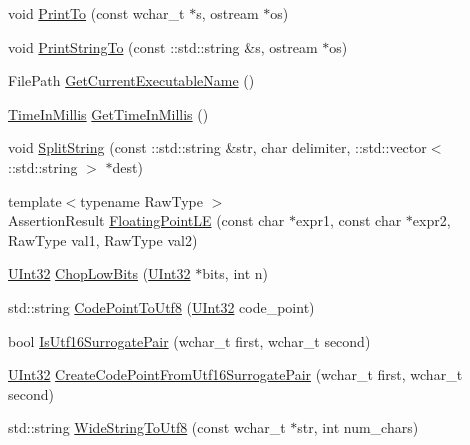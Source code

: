 \begin{DoxyCompactItemize}
void \mbox{\hyperlink{namespacetesting_1_1internal_afc20fb56b2547a8f91f9ff99650f2024}{Print\+To}} (const wchar\+\_\+t $\ast$s, ostream $\ast$os)
\item 
void \mbox{\hyperlink{namespacetesting_1_1internal_ad609167d8d6792b0fb186539e0e159bd}{Print\+String\+To}} (const \+::std\+::string \&s, ostream $\ast$os)
\item 
File\+Path \mbox{\hyperlink{namespacetesting_1_1internal_a7a2bbf069f75bc99873976ad6fc356ad}{Get\+Current\+Executable\+Name}} ()
\item 
\mbox{\hyperlink{namespacetesting_1_1internal_a5eed833eddf9ea8ca45546c125f4ef0c}{Time\+In\+Millis}} \mbox{\hyperlink{namespacetesting_1_1internal_ae66b46943a429e6efb1db456d4cae90c}{Get\+Time\+In\+Millis}} ()
\item 
void \mbox{\hyperlink{namespacetesting_1_1internal_a8eb8eddf760375a490e007b20777ec56}{Split\+String}} (const \+::std\+::string \&str, char delimiter, \+::std\+::vector$<$ \+::std\+::string $>$ $\ast$dest)
\item 
{\footnotesize template$<$typename Raw\+Type $>$ }\\Assertion\+Result \mbox{\hyperlink{namespacetesting_1_1internal_a17b52b6b1f81f6dcad5cc4d12e5173a6}{Floating\+Point\+LE}} (const char $\ast$expr1, const char $\ast$expr2, Raw\+Type val1, Raw\+Type val2)
\item 
\mbox{\hyperlink{namespacetesting_1_1internal_a436defbb8e92c8e94e33ebcc86f278ba}{U\+Int32}} \mbox{\hyperlink{namespacetesting_1_1internal_a2c54b453387aa8a18f2f3e09f10b5a7d}{Chop\+Low\+Bits}} (\mbox{\hyperlink{namespacetesting_1_1internal_a436defbb8e92c8e94e33ebcc86f278ba}{U\+Int32}} $\ast$bits, int n)
\item 
std\+::string \mbox{\hyperlink{namespacetesting_1_1internal_a0c0f9558efb9abb965851c4738cdc725}{Code\+Point\+To\+Utf8}} (\mbox{\hyperlink{namespacetesting_1_1internal_a436defbb8e92c8e94e33ebcc86f278ba}{U\+Int32}} code\+\_\+point)
\item 
bool \mbox{\hyperlink{namespacetesting_1_1internal_a681895f8cc32286211be9889da107394}{Is\+Utf16\+Surrogate\+Pair}} (wchar\+\_\+t first, wchar\+\_\+t second)
\item 
\mbox{\hyperlink{namespacetesting_1_1internal_a436defbb8e92c8e94e33ebcc86f278ba}{U\+Int32}} \mbox{\hyperlink{namespacetesting_1_1internal_ac8ef1bb10cd9e69de939789b759e6bc9}{Create\+Code\+Point\+From\+Utf16\+Surrogate\+Pair}} (wchar\+\_\+t first, wchar\+\_\+t second)
\item 
std\+::string \mbox{\hyperlink{namespacetesting_1_1internal_a05b8c86ff38243f34d8f839a0eadefb1}{Wide\+String\+To\+Utf8}} (const wchar\+\_\+t $\ast$str, int num\+\_\+chars)

\end{DoxyCompactItemize}
